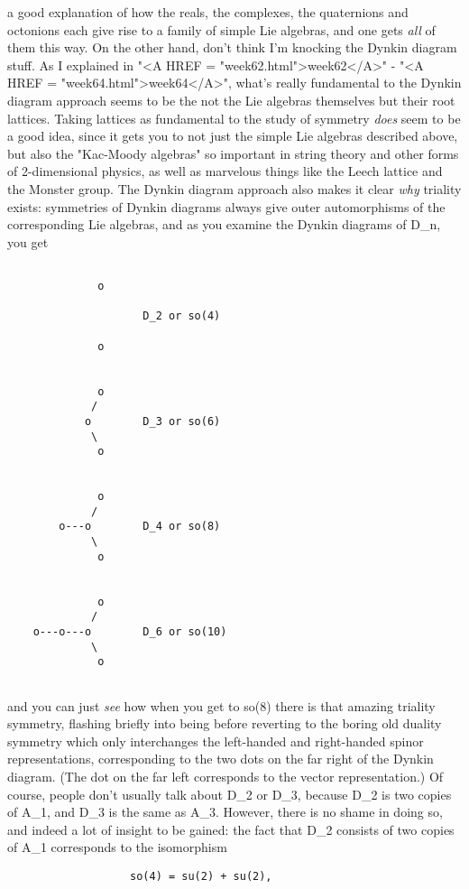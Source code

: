 a good explanation of how the reals, the complexes, the quaternions 
and octonions each give rise to a family of simple Lie algebras, and 
one gets \emph{all} of them this way.
On the other hand, don't think I'm knocking the Dynkin diagram stuff.
As I explained in "<A HREF = "week62.html">week62</A>" - 
"<A HREF = "week64.html">week64</A>", what's really fundamental
to the Dynkin diagram approach seems to be the not the Lie
algebras themselves but their root lattices.  Taking lattices
as fundamental to the study of symmetry \emph{does} seem to be a good
idea, since it gets you to not just the simple Lie algebras
described above, but also the "Kac-Moody algebras" so important
in string theory and other forms of 2-dimensional physics, as well
as marvelous things like the Leech lattice and the Monster group.
The Dynkin diagram approach also makes it clear \emph{why} triality 
exists: symmetries of Dynkin diagrams always give outer automorphisms
of the corresponding Lie algebras, and as you examine the Dynkin
diagrams of D_n, you get
\begin{verbatim}
 
              o  
                
                     D_2 or so(4) 
                
              o  
 
 
              o  
             /   
            o        D_3 or so(6)
             \   
              o  
 
 
              o  
             /   
        o---o        D_4 or so(8)
             \   
              o  
 
 
              o  
             /   
    o---o---o        D_6 or so(10)
             \   
              o  
 
\end{verbatim}
    
and you can just \emph{see} how when you get to so(8) there is that
amazing triality symmetry, flashing briefly into being before reverting
to the boring old duality symmetry which only interchanges the 
left-handed and right-handed spinor representations, corresponding
to the two dots on the far right of the Dynkin diagram.  (The dot
on the far left corresponds to the vector representation.)
Of course, people don't usually talk about D_2 or D_3, because 
D_2 is two copies of A_1, and D_3 is the same as A_3.  However, 
there is no shame in doing so, and indeed a lot of insight to 
be gained: the fact that D_2 consists of two copies of A_1 
corresponds to the isomorphism
\begin{verbatim}
                   so(4) = su(2) + su(2),
\end{verbatim}
    
